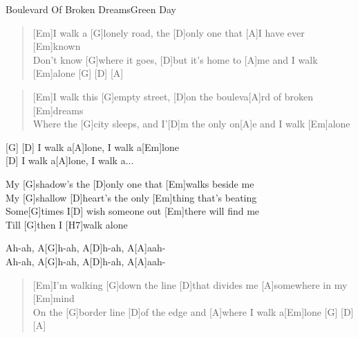 \begin{song}{Boulevard Of Broken Dreams}{Green Day}

    \begin{verse}  
        [Em]I walk a [G]lonely road, the [D]only one that [A]I have ever [Em]known \\
        Don't know [G]where it goes, [D]but it's home to [A]me and I walk [Em]alone [G] \hspace{1em}
        [D] \hspace{1em} [A]
    \end{verse}  

    \begin{verse}  
        [Em]I walk this [G]empty street, [D]on the bouleva[A]rd of broken [Em]dreams\\
        Where the [G]city sleeps, and I'[D]m the only on[A]e and I walk [Em]alone\\
    \end{verse}  

    \begin{interlude}
        [(Em)] \hspace{1em} [G] \hspace{1em} [D] I walk a[A]lone, I walk a[Em]lone \\
        [G] \hspace{1em} [D] I walk a[A]lone, I walk a...
    \end{interlude}

    \begin{chorus}
        [C]My [G]shadow's the [D]only one that [Em]walks beside me \\
        [C]My [G]shallow [D]heart's the only [Em]thing that's beating \\
        [C]Some[G]times I[D] wish someone out [Em]there will find me \\
        [C]Till [G]then I [H7]walk alone
    \end{chorus}

    \begin{interlude}
        [Em]Ah-ah, A[G]h-ah, A[D]h-ah, A[A]aah- \\
        [Em]Ah-ah, A[G]h-ah, A[D]h-ah, A[A]aah-
    \end{interlude}

    \begin{verse}  
        [Em]I'm walking [G]down the line [D]that divides me [A]somewhere in my [Em]mind\\
        On the [G]border line [D]of the edge and [A]where I walk a[Em]lone [G] \hspace{1em} [D] \hspace{1em} [A]
    \end{verse}  


\end{song}
